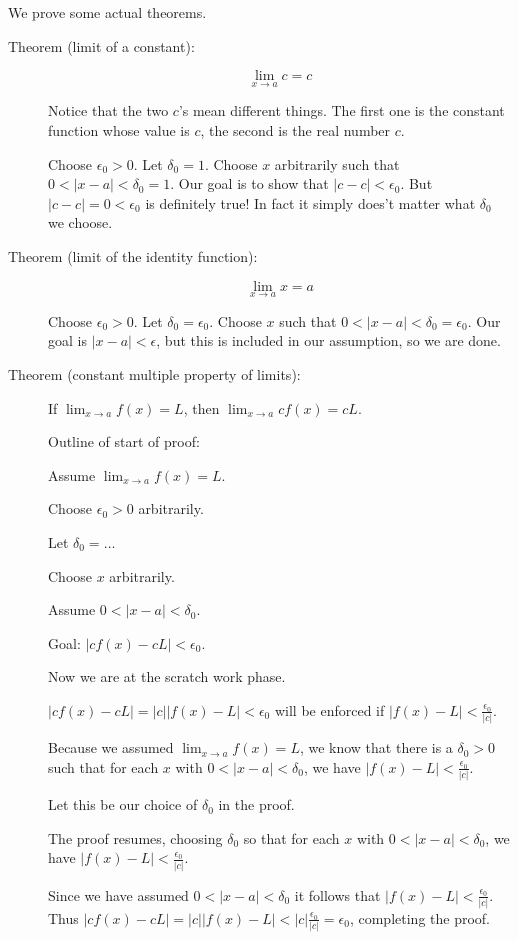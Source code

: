 \documentclass[12pt]{article}
\begin{document}
We prove some actual theorems.

\begin{description}

\item[Theorem (limit of a constant):]  $$\lim_{x \rightarrow a} c=c$$

Notice that the two $c$'s mean different things.  The first one is the constant function whose value is $c$,
the second is the real number $c$.

Choose $\epsilon_0>0$.  Let $\delta_0=1$.  Choose $x$ arbitrarily such that $0<|x-a|<\delta_0=1$.
Our goal is to show that $|c-c|<\epsilon_0$.  But $|c-c|=0<\epsilon_0$ is definitely true!  In fact it simply
does't matter what $\delta_0$ we choose.

\item[Theorem (limit of the identity function):]  $$\lim_{x \rightarrow a} x=a$$

Choose $\epsilon_0>0$.  Let $\delta_0=\epsilon_0$.  Choose $x$ such that $0<|x-a|<\delta_0=\epsilon_0$.
Our goal is $|x-a|<\epsilon$, but this is included in our assumption, so we are done.

\item[Theorem (constant multiple property of limits):]  If $\lim_{x\rightarrow a} f(x)= L$, then $\lim_{x \rightarrow a} cf(x) = cL$.

Outline of start of proof:

Assume $\lim_{x\rightarrow a} f(x)= L$.

Choose $\epsilon_0>0$ arbitrarily.

Let $\delta_0 =\ldots$

Choose $x$ arbitrarily.

Assume $0<|x-a|<\delta_0$.

Goal:  $|cf(x)-cL|<\epsilon_0$.

Now we are at the scratch work phase.

$|cf(x)-cL|=|c||f(x)-L|<\epsilon_0$ will be enforced if $|f(x)-L|<\frac{\epsilon_0}{|c|}$.

Because we assumed $\lim_{x\rightarrow a} f(x)= L$, we know that there is a $\delta_0>0$ such that
for each $x$ with $0<|x-a|<\delta_0$, we have $|f(x)-L|<\frac{\epsilon_0}{|c|}$.

Let this be our choice of $\delta_0$ in the proof.

The proof resumes, choosing $\delta_0$ so that for each $x$ with $0<|x-a|<\delta_0$, we have $|f(x)-L|<\frac{\epsilon_0}{|c|}$.

Since we have assumed $0<|x-a|<\delta_0$ it follows that $|f(x)-L|<\frac{\epsilon_0}{|c|}$.  Thus
$|cf(x)-cL| = |c||f(x)-L| < |c|\frac{\epsilon_0}{|c|}=\epsilon_0$, completing the proof.


\end{description}
\end{document}
